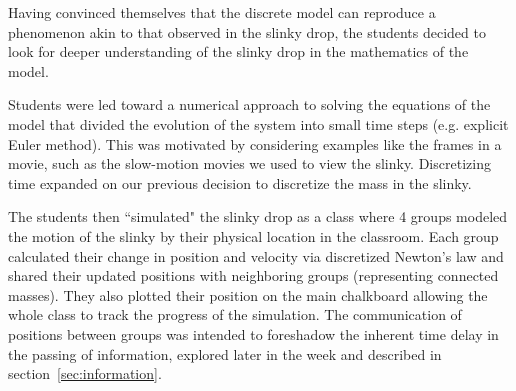 \documentclass[pre,preprint,superscriptaddress,longbibliography]{revtex4-1}
\newcommand{\eq}[1]{eq.~\eqref{eq:#1}}
\renewcommand{\sec}[1]{section~\ref{sec:#1}}
\newcommand{\nn}{\nonumber}
\begin{document}
Having convinced themselves that the discrete model can reproduce a phenomenon akin to that observed in the slinky drop,
the students decided to look for deeper understanding of the slinky drop in the mathematics of the model.  

Students were led toward a numerical approach to solving
the equations of the model that divided the evolution of the system into small time
steps (e.g.  explicit Euler method). This was motivated by considering examples like the frames in a movie, such as the slow-motion movies we used to view the slinky. Discretizing time expanded on our previous decision to discretize the mass in the slinky.


The students then ``simulated" the slinky drop as a class where 4 groups modeled the motion of the slinky by their physical location in the classroom. Each group calculated their change in position and velocity via discretized Newton's law and shared their updated positions with neighboring groups (representing connected masses).  %
They also plotted their position on the main chalkboard allowing the whole class to track the progress of the simulation.
The communication of positions between groups was intended 
to foreshadow the inherent time delay in the passing of information, explored later in
the week and described in \sec{information}.
\end{document}
